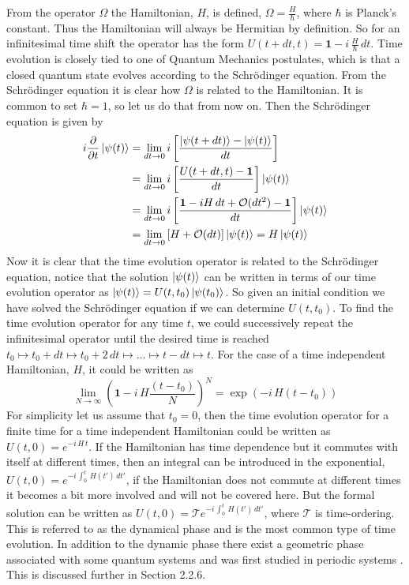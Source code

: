 From the operator $\Omega$ the Hamiltonian, $H$, is defined, $\Omega = \frac{H}{\hbar}$, where $\hbar$ is Planck's constant. Thus the Hamiltonian will always be Hermitian by definition. So for an infinitesimal time shift the operator has the form $U(t + dt, t) = \mathbf{1} - i\,\frac{H}{\hbar} \,dt$.
Time evolution is closely tied to one of Quantum Mechanics postulates, which is that a closed quantum state evolves according to the Schrödinger equation. From the Schrödinger equation it is clear how $\Omega$ is related to the Hamiltonian. It is common to set $\hbar = 1$, so let us do that from now on. Then the Schrödinger equation is given by 
\begin{equation} 
\begin{aligned}
i \pdv{}{t} \ket{\psi(t)} &= \lim_{dt \rightarrow 0} i\left[ \frac{\ket{\psi(t+dt)} - \ket{\psi(t)}}{dt} \right] \\&= \lim_{dt \rightarrow 0} i\left[ \frac{U(t+dt,t) - \mathbf{1}}{dt} \right]\ket{\psi(t)} \\&= \lim_{dt \rightarrow 0} i\left[ \frac{\mathbf{1} - iH\,dt + \mathcal{O}(dt^2) - \mathbf{1}}{dt} \right]\ket{\psi(t)} \\&= \lim_{dt \rightarrow 0} \left[H + \mathcal{O}(dt) \right]\ket{\psi(t)}  = H\ket{\psi(t)}
\end{aligned}
\label{eq:schro}
\end{equation} 
Now it is clear that the time evolution operator is related to the Schrödinger equation, notice that the solution $\ket{\psi(t)}$ can be written in terms of our time evolution operator as
$\ket{\psi(t)} = U(t,t_0)\ket{\psi(t_0)}$. So given an initial condition we have solved the Schrödinger equation if we can determine $U(t,t_0)$.  
To find the time evolution operator for any time $t$, we could successively repeat the infinitesimal operator until the desired time is reached $t_0 \mapsto t_0 + dt \mapsto t_0 + 2\,dt \mapsto \dots \mapsto t - dt \mapsto t$. For the case of a time independent Hamiltonian, $H$, it could be written as
\begin{equation}
\lim_{N \rightarrow \infty} \left(\mathbf{1} - i\,H\frac{(t-t_0)}{N} \right)^N = \exp\left(- i\,H(t-t_0) \right)
\end{equation}
For simplicity let us assume that $t_0 = 0$, then the time evolution operator for a finite time for a time independent Hamiltonian could be written as $U(t,0) = e^{-i\,H\,t}$. If the Hamiltonian has time dependence but it commutes with itself at different times, then an integral can be introduced in the exponential, $U(t,0) = e^{-i\,\int_0^t \,H(t')\, dt'}$, if the Hamiltonian does not commute at different times it becomes a bit more involved and will not be covered here. But the formal solution can be written as $U(t,0) = \mathcal{T}e^{-i\,\int_0^t \,H(t')\, dt'}$, where $\mathcal{T}$ is time-ordering. This is referred to as the dynamical phase and is the most common type of time evolution. In addition to the dynamic phase there exist a geometric phase associated with some quantum systems and was first studied in periodic systems \cite{berry}. This is discussed further in Section 2.2.6.

